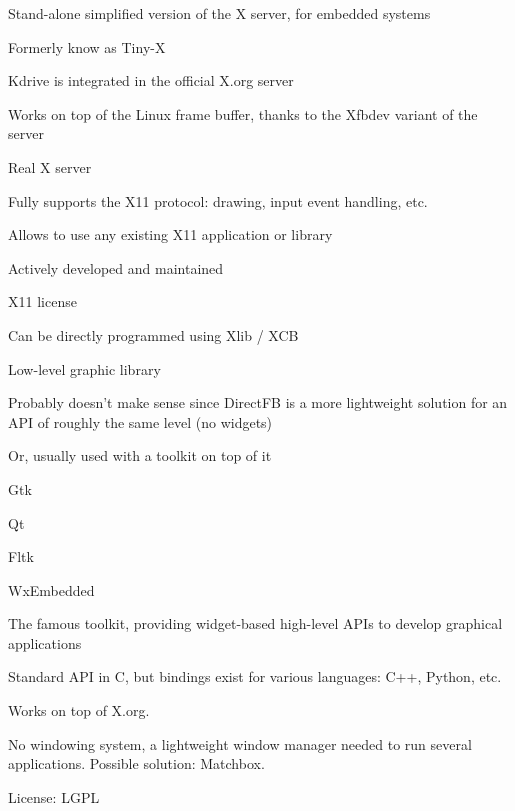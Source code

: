 
    \startitemize
    \item Stand-alone simplified version of the X server, for embedded
      systems
      \startitemize
      \item Formerly know as Tiny-X
      \item Kdrive is integrated in the official X.org server
      \stopitemize
    \item Works on top of the Linux frame buffer, thanks to the Xfbdev
      variant of the server
    \item Real X server
      \startitemize
      \item Fully supports the X11 protocol: drawing, input event
        handling, etc.
      \item Allows to use any existing X11 application or library
      \stopitemize
    \item Actively developed and maintained
    \item X11 license
    \item {}
    \stopitemize


  \startitemize
  \item Can be directly programmed using Xlib / XCB
    \startitemize
    \item Low-level graphic library
    \item Probably doesn't make sense since DirectFB is a more
      lightweight solution for an API of roughly the same level (no
      widgets)
    \stopitemize
  \item Or, usually used with a toolkit on top of it
    \startitemize
    \item Gtk
    \item Qt
    \item Fltk
    \item WxEmbedded
    \stopitemize
  \stopitemize

    \startitemize
    \item The famous toolkit, providing widget-based high-level APIs to
      develop graphical applications
    \item Standard API in C, but bindings exist for various languages:
      C++, Python, etc.
    \item Works on top of X.org.
    \item No windowing system, a lightweight window manager needed to
      run several applications. Possible solution: Matchbox.
    \item License: LGPL
    \item {}
    \stopitemize

